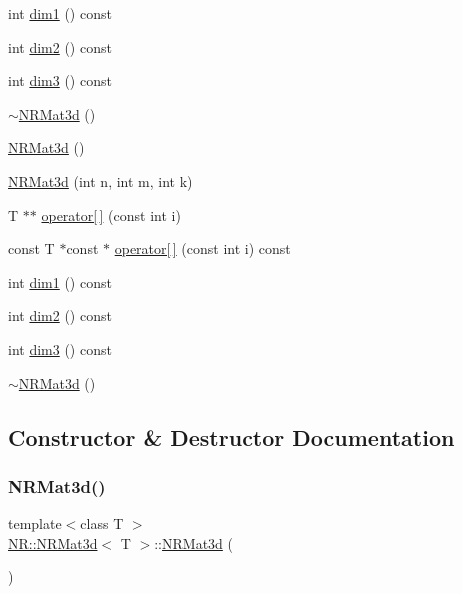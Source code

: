 \begin{DoxyCompactItemize}
\item 
int \mbox{\hyperlink{classNR_1_1NRMat3d_ae46651c069e6954e03e5d3a39ffd2891}{dim1}} () const
\item 
int \mbox{\hyperlink{classNR_1_1NRMat3d_a8c287b30748a7fdfc3f4424e26f88252}{dim2}} () const
\item 
int \mbox{\hyperlink{classNR_1_1NRMat3d_aec8af45aa2025ea53f2967a79d0fe233}{dim3}} () const
\item 
\mbox{\hyperlink{classNR_1_1NRMat3d_a6c8dc36e24e162855f99ccfbc380ff52}{$\sim$\+N\+R\+Mat3d}} ()
\item 
\mbox{\hyperlink{classNR_1_1NRMat3d_a92498ec487349e85209cfad66e6b7d4e}{N\+R\+Mat3d}} ()
\item 
\mbox{\hyperlink{classNR_1_1NRMat3d_a72437875f6affe5898dee887c3ebfe4c}{N\+R\+Mat3d}} (int n, int m, int k)
\item 
T $\ast$$\ast$ \mbox{\hyperlink{classNR_1_1NRMat3d_a24920cbac3d063139022a4aafee24e4a}{operator\mbox{[}$\,$\mbox{]}}} (const int i)
\item 
const T $\ast$const  $\ast$ \mbox{\hyperlink{classNR_1_1NRMat3d_a17f8d263fbe8876a2219cc1a4bdac0ca}{operator\mbox{[}$\,$\mbox{]}}} (const int i) const
\item 
int \mbox{\hyperlink{classNR_1_1NRMat3d_ae46651c069e6954e03e5d3a39ffd2891}{dim1}} () const
\item 
int \mbox{\hyperlink{classNR_1_1NRMat3d_a8c287b30748a7fdfc3f4424e26f88252}{dim2}} () const
\item 
int \mbox{\hyperlink{classNR_1_1NRMat3d_aec8af45aa2025ea53f2967a79d0fe233}{dim3}} () const
\item 
\mbox{\hyperlink{classNR_1_1NRMat3d_a6c8dc36e24e162855f99ccfbc380ff52}{$\sim$\+N\+R\+Mat3d}} ()
\end{DoxyCompactItemize}


\subsection{Constructor \& Destructor Documentation}
\mbox{\label{classNR_1_1NRMat3d_a92498ec487349e85209cfad66e6b7d4e}} 
\subsubsection{\texorpdfstring{NRMat3d()}{NRMat3d()}\hspace{0.1cm}{\footnotesize\ttfamily [1/6]}}
{\footnotesize\ttfamily template$<$class T $>$ \\
\mbox{\hyperlink{classNR_1_1NRMat3d}{N\+R\+::\+N\+R\+Mat3d}}$<$ T $>$\+::\mbox{\hyperlink{classNR_1_1NRMat3d}{N\+R\+Mat3d}} (\begin{DoxyParamCaption}{ }\end{DoxyParamCaption})}

